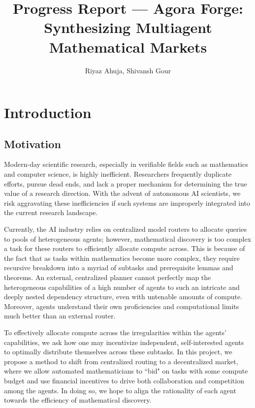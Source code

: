 \documentclass[letterpaper]{article} %
\title{Progress Report --- Agora Forge: Synthesizing Multiagent Mathematical Markets}
\author{
    Riyaz Ahuja,
    Shivansh Gour
}
\begin{document}
\maketitle

\begin{abstract}

\end{abstract}

\section{Introduction}
\subsection{Motivation} %
Modern-day scientific research, especially in verifiable fields such as mathematics and computer science, is highly inefficient. Researchers frequently duplicate efforts, pursue dead ends, and lack a proper mechanism for determining the true value of a research direction. With the advent of autonomous AI scientists, we risk aggravating these inefficiencies if such systems are improperly integrated into the current research landscape.

Currently, the AI industry relies on centralized model routers to allocate queries to pools of heterogeneous agents; however, mathematical discovery is too complex a task for these routers to efficiently allocate compute across. This is because of the fact that as tasks within mathematics become more complex, they require recursive breakdown into a myriad of subtasks and prerequisite lemmas and theorems. An external, centralized planner cannot perfectly map the heterogeneous capabilities of a high number of agents to such an intricate and deeply nested dependency structure, even with untenable amounts of compute. Moreover, agents understand their own proficiencies and computational limits much better than an external router.

To effectively allocate compute across the irregularities within the agents' capabilities, we ask how one may incentivize independent, self-interested agents to optimally distribute themselves across these subtasks. In this project, we propose a method to shift from centralized routing to a decentralized market, where we allow automated mathematicians to ``bid" on tasks with some compute budget and use financial incentives to drive both collaboration and competition among the agents. In doing so, we hope to align the rationality of each agent towards the efficiency of mathematical discovery.
\end{document}
